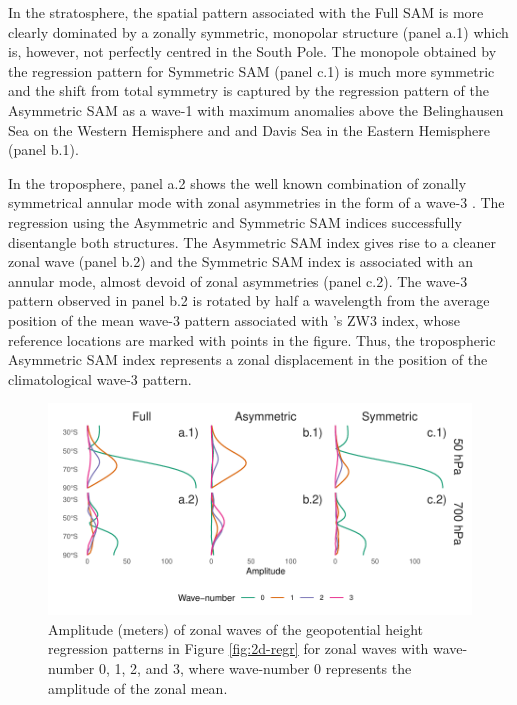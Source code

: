 \documentclass[]{ametsocV5}
\begin{document}
In the stratosphere, the spatial pattern associated with the Full SAM is
more clearly dominated by a zonally symmetric, monopolar structure
(panel a.1) which is, however, not perfectly centred in the South Pole.
The monopole obtained by the regression pattern for Symmetric SAM (panel
c.1) is much more symmetric and the shift from total symmetry is
captured by the regression pattern of the Asymmetric SAM as a wave-1
with maximum anomalies above the Belinghausen Sea on the Western
Hemisphere and and Davis Sea in the Eastern Hemisphere (panel b.1).

In the troposphere, panel a.2 shows the well known combination of
zonally symmetrical annular mode with zonal asymmetries in the form of a
wave-3 \citep{fogt2012}. The regression using the Asymmetric and
Symmetric SAM indices successfully disentangle both structures. The
Asymmetric SAM index gives rise to a cleaner zonal wave (panel b.2) and
the Symmetric SAM index is associated with an annular mode, almost
devoid of zonal asymmetries (panel c.2). The wave-3 pattern observed in
panel b.2 is rotated by half a wavelength from the average position of
the mean wave-3 pattern associated with \citet{raphael2004}'s ZW3 index,
whose reference locations are marked with points in the figure. Thus,
the tropospheric Asymmetric SAM index represents a zonal displacement in
the position of the climatological wave-3 pattern.

\begin{figure}
\includegraphics{wave-amplitude-1} \caption{Amplitude (meters) of zonal waves of the geopotential height regression patterns in Figure \ref{fig:2d-regr} for zonal waves with wave-number 0, 1, 2, and 3, where wave-number 0 represents the amplitude of the zonal mean.}\label{fig:wave-amplitude}
\end{figure}
\end{document}
